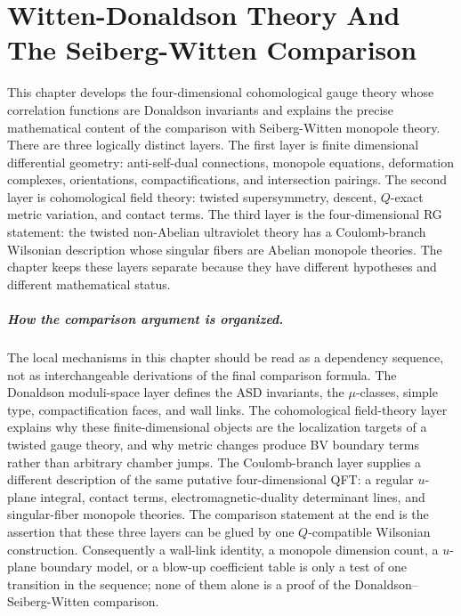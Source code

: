 \chapter{Witten-Donaldson Theory And The Seiberg-Witten Comparison}
\label{ch:tqft-witten-donaldson-seiberg-witten-comparison}

\ConventionsEuclidean

This chapter develops the four-dimensional cohomological gauge theory whose
correlation functions are Donaldson invariants and explains the precise
mathematical content of the comparison with Seiberg-Witten monopole theory.
There are three logically distinct layers.  The first layer is finite
dimensional differential geometry: anti-self-dual connections, monopole
equations, deformation complexes, orientations, compactifications, and
intersection pairings.  The second layer is cohomological field theory:
twisted supersymmetry, descent, \(Q\)-exact metric variation, and contact
terms.  The third layer is the four-dimensional RG statement: the twisted
non-Abelian ultraviolet theory has a Coulomb-branch Wilsonian description
whose singular fibers are Abelian monopole theories.  The chapter keeps these
layers separate because they have different hypotheses and different
mathematical status.

\paragraph{How the comparison argument is organized.}
The local mechanisms in this chapter should be read as a dependency sequence,
not as interchangeable derivations of the final comparison formula.  The
Donaldson moduli-space layer defines the ASD invariants, the \(\mu\)-classes,
simple type, compactification faces, and wall links.  The cohomological
field-theory layer explains why these finite-dimensional objects are the
localization targets of a twisted gauge theory, and why metric changes produce
BV boundary terms rather than arbitrary chamber jumps.  The Coulomb-branch
layer supplies a different description of the same putative four-dimensional
QFT: a regular \(u\)-plane integral, contact terms, electromagnetic-duality
determinant lines, and singular-fiber monopole theories.  The comparison
statement at the end is the assertion that these three layers can be glued by
one \(Q\)-compatible Wilsonian construction.  Consequently a wall-link
identity, a monopole dimension count, a \(u\)-plane boundary model, or a
blow-up coefficient table is only a test of one transition in the sequence;
none of them alone is a proof of the Donaldson--Seiberg-Witten comparison.

